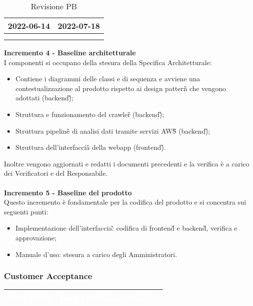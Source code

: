 {{{\begin{longtable}{C{.4\freewidth} C{.4\freewidth}}
        2022-06-14 & 2022-07-18 \\
        \bottomrule
        \\
        \caption{Revisione PB}
        \end{longtable}
    \textbf{Incremento 4 - Baseline architetturale} \\
    I componenti si occupano della stesura della Specifica Architetturale: 
    \begin{itemize}
        \item Contiene i diagrammi delle classi e di sequenza e avviene una contestualizzazione al prodotto rispetto ai design pattern\G{} che vengono adottati (backend\G);
        \item Struttura e funzionamento del crawler\G{} (backend\G);
        \item Struttura pipeline\G{} di analisi dati tramite servizi AWS\G{} (backend\G);
        \item Struttura dell'interfaccia\G{} della webapp (frontend\G).
    \end{itemize}
    Inoltre vengono aggiornati e redatti i documenti precedenti e la verifica è a carico dei Verificatori e del Responsabile.\\ \\
    \textbf{Incremento 5 - Baseline del prodotto} \\
    Questo incremento è fondamentale per la codifica del prodotto e si concentra sui seguenti punti:
    \begin{itemize}
        \item Implementazione dell'interfaccia\G: codifica di frontend\G{} e backend\G{}, verifica e approvazione;
        \item Manuale d'uso: stesura a carico degli Amministratori.
    \end{itemize}
    }
\newpage
    \subsubsection{Customer Acceptance} {
        \setlength{\freewidth}{\dimexpr\textwidth-30\tabcolsep}
        \renewcommand{\arraystretch}{1.0}
        \setlength{\aboverulesep}{0pt}
        \setlength{\belowrulesep}{0pt}
        \begin{longtable}{C{.4\freewidth} C{.4\freewidth}}
        \toprule
        \textcolor{white}{\textbf{Data inizio}}&
        \textcolor{white}{\textbf{Data previsione revisione}} \\
        \toprule
        \endhead
            

\end{longtable}}}}
